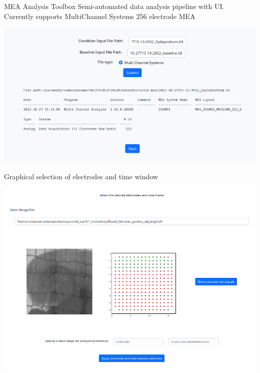 \documentclass[10pt]{beamer}
\begin{document}
\begin{frame}[allowframebreaks]{MEA Analysis Toolbox}
    Semi-automated data analysis pipeline with UI. \\
   
     Currently supports MultiChannel Systems 256 electrode MEA \\ [1em]
      \begin{center}
        \includegraphics[keepaspectratio,width=0.8\framewidth]{img/4_import.png}
      \end{center}
      \framebreak
      
     Graphical selection of electrodes and time window \\ 
      \begin{center}
        \includegraphics[keepaspectratio,width=0.8\framewidth]{img/4_select.png}
      \end{center}
      \framebreak
      

\end{frame}
\end{document}
